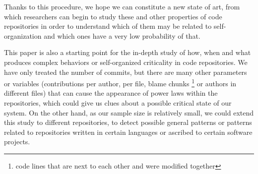 \documentclass[conference]{IEEEtran}
\begin{document}
Thanks to this procedure, we hope we can constitute a new state of art, from which researchers can begin to study these and other properties of code repositories in order to understand which of them may be related to self-organization and which ones have a very low probability of that.  

This paper is also a starting point for the in-depth study of how,
when and what produces complex behaviors or self-organized criticality in code repositories. We have only treated the number of commits, but there are many other parameters or variables (contributions per author, per file, blame chunks \footnote{code lines that are next to each other and were modified together} or authors in different files)
that can cause the appearance of power laws within the repositories, which could give us clues about a possible critical state of our system.
On the other hand, as our sample size is relatively small, we could extend this study to different repositories, to detect possible general patterns or patterns related to repositories written in certain languages or ascribed to certain software projects.



\end{document}
